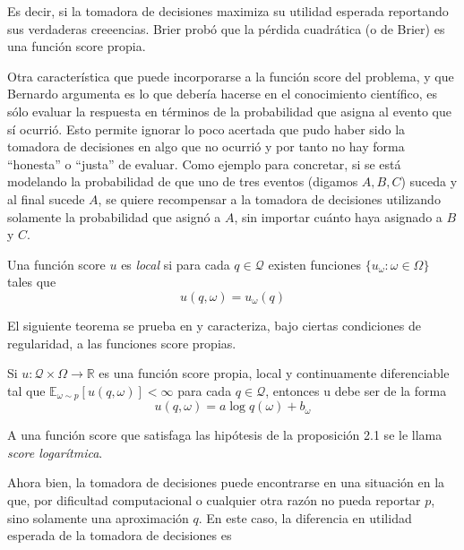 \documentclass[main.tex]{subfiles}
\begin{document}
Es decir, si la tomadora de decisiones maximiza su utilidad esperada reportando sus verdaderas creeencias. Brier probó que la pérdida cuadrática (o de Brier) es una función score propia.

Otra característica que puede incorporarse a la función score del problema, y que Bernardo argumenta es lo que debería hacerse en el conocimiento científico, es sólo evaluar la respuesta en términos de la probabilidad que asigna al evento que sí ocurrió. Esto permite ignorar lo poco acertada que pudo haber sido la tomadora de decisiones en algo que no ocurrió y por tanto no hay forma \enquote{honesta} o \enquote{justa} de evaluar. Como ejemplo para concretar, si se está modelando la probabilidad de que uno de tres eventos (digamos $A, B, C$) suceda y al final sucede $A$, se quiere recompensar a la tomadora de decisiones utilizando solamente la probabilidad que asignó a $A$, sin importar cuánto haya asignado a $B$ y $C$. 

\begin{definition}
	Una función score $u$ es \textit{local} si para cada $q \in \mathcal{Q}$ existen funciones $\{u_\omega: \omega\in\Omega\}$ tales que
	\begin{equation*}
		u(q, \omega) = u_\omega(q)
	\end{equation*}
\end{definition}

El siguiente teorema se prueba en \cite{bernardo} y caracteriza, bajo ciertas condiciones de regularidad, a las funciones score propias.

\begin{prop}
	Si $u:\mathcal{Q}\times\Omega \to \mathbb{R}$ es una función score propia, local y continuamente diferenciable tal que $\mathbb{E}_{\omega \sim p}\left[u(q,\omega)\right] < \infty$ para cada $q \in \mathcal{Q}$, entonces u debe ser de la forma
	\begin{equation*}
		u(q, \omega) = a\log q(\omega)+b_\omega
	\end{equation*}
\end{prop} 

\begin{definition}
A una función score que satisfaga las hipótesis de la proposición 2.1 se le llama \textit{score logarítmica}.	
\end{definition}

Ahora bien, la tomadora de decisiones puede encontrarse en una situación en la que, por dificultad computacional o cualquier otra razón no pueda reportar $p$, sino solamente una aproximación $q$. En este caso, la diferencia en utilidad esperada de la tomadora de decisiones es 
\end{document}
